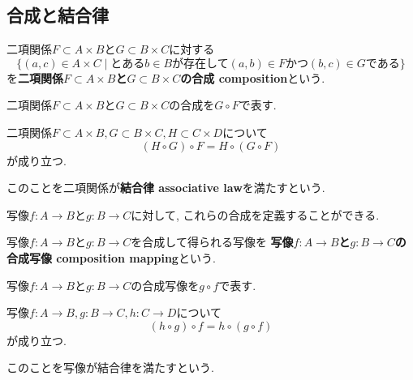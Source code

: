\subsection{合成と結合律}
\begin{Def}
二項関係$F\subset A\times B$と$G\subset B\times C$に対する
\[
\{(a,c)\in A\times C\mid \text{とある}b\in B\text{が存在して}(a,b)\in F \text{かつ} (b,c)\in G\text{である}\}
\]
を{\bf 二項関係$F\subset A\times B$と$G\subset B\times C$の合成 composition}という.
\end{Def}
\begin{Notation}
二項関係$F\subset A\times B$と$G\subset B\times C$の合成を$G\circ F$で表す.
\end{Notation}
\begin{Prop}
二項関係$F\subset A\times B ,G\subset B\times C, H\subset C\times D$について
\[
(H\circ G)\circ F=H\circ (G\circ F)
\]
が成り立つ.
\end{Prop}
このことを二項関係が{\bf 結合律 associative law}を満たすという.
\begin{Prop}
写像$f:A\rightarrow B$と$g:B\rightarrow C$に対して,
これらの合成を定義することができる.
\end{Prop}
\begin{Def}
写像$f:A\rightarrow B$と$g:B\rightarrow C$を合成して得られる写像を
{\bf 写像$f:A\rightarrow B$と$g:B\rightarrow C$の合成写像 composition mapping}という.
\end{Def}
\begin{Notation}
写像$f:A\rightarrow B$と$g:B\rightarrow C$の合成写像を$g\circ f$で表す.
\end{Notation}
\begin{Prop}
写像$f:A\rightarrow B, g:B\rightarrow C,
h:C\rightarrow D$について
\[
(h\circ g)\circ f=h\circ(g\circ f)
\]
が成り立つ.
\end{Prop}
このことを写像が結合律を満たすという.
